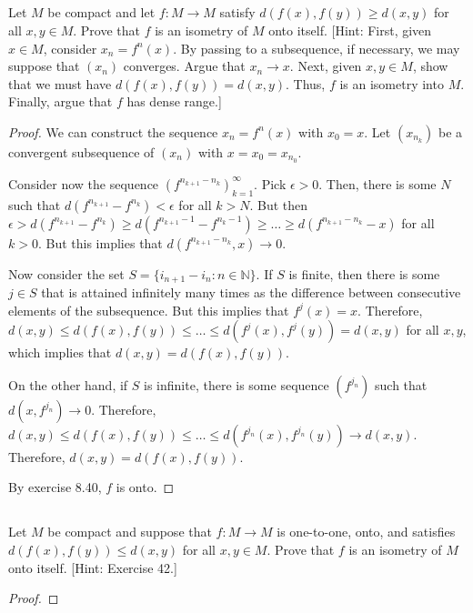 \newpage

\subsection{} Let $M$ be compact and let $f : M \rightarrow M$ satisfy $d(f(x), f(y)) \geq d(x , y)$ for all $x, y \in M$. Prove that $f$ is an isometry of $M$ onto itself. [Hint: First, given $x \in M$, consider $x_n = f^n(x)$. By passing to a subsequence, if necessary, we may suppose that $(x_n)$ converges. Argue that $x_n \rightarrow x$. Next, given $x, y \in M$, show that we must have $d(f(x), f(y)) = d(x , y)$. Thus, $f$ is an isometry into $M$. Finally, argue that $f$ has dense range.] 

\begin{proof}
We can construct the sequence $x_n = f^n(x)$ with $x_0 = x$. Let $(x_{n_k})$ be a convergent subsequence of $(x_n)$ with $x = x_0 = x_{n_0}$.


Consider now the sequence $(f^{n_{k+1} - n_k})_{k=1}^\infty$. Pick $\epsilon > 0$. Then, there is some $N$ such that $d(f^{n_{k+1}} - f^{n_k}) < \epsilon$ for all $k>N$. But then $\epsilon > d(f^{n_{k+1}} - f^{n_k}) \geq d(f^{n_{k+1}-1} - f^{n_k-1}) \geq \dots \geq d(f^{n_{k+1}-n_k} - x)$ for all $k > 0$. But this implies that $d(f^{n_{k+1} - n_k},x) \rightarrow 0$. 

\vspace{1em}

Now consider the set $S = \{i_{n+1} - i_n: n \in \mathbb{N}\}$. If $S$ is finite, then there is some $j \in S$ that is attained infinitely many times as the difference between consecutive elements of the subsequence. But this implies that $f^j(x) = x$. Therefore, $d(x,y) \leq d(f(x), f(y)) \leq \dots \leq d(f^j(x), f^j(y)) = d(x,y)$ for all $x,y$, which implies that $d(x,y) = d(f(x), f(y))$.

On the other hand, if $S$ is infinite, there is some sequence $(f^{j_n})$ such that $d(x, f^{j_n}) \rightarrow 0$. Therefore, $d(x,y) \leq d(f(x), f(y)) \leq \dots \leq d(f^{j_n}(x), f^{j_n}(y)) \rightarrow d(x,y)$. Therefore, $d(x,y) = d(f(x), f(y))$.

By exercise 8.40, $f$ is onto.
\end{proof}

\subsection{} Let $M$ be compact and suppose that $f: M \rightarrow M$ is one-to-one, onto, and satisfies $d(f(x ), f(y)) \leq d(x , y)$ for all $x, y \in M$. Prove that $f$ is an isometry of $M$ onto itself.  [Hint: Exercise 42.]

\begin{proof}

\end{proof}
